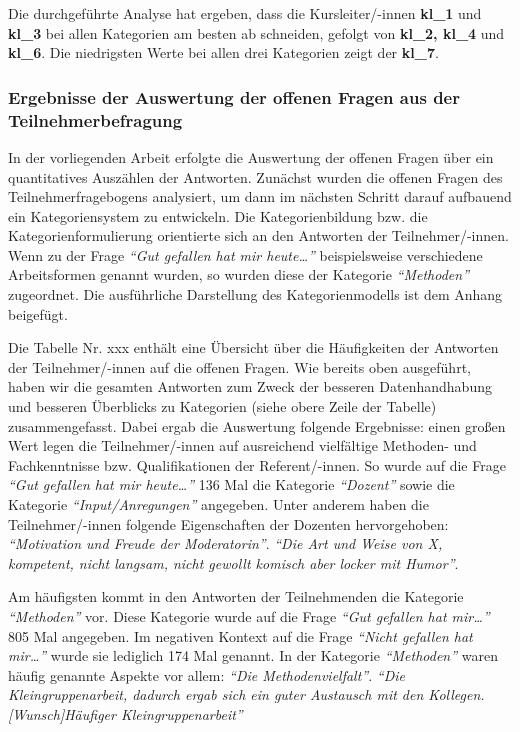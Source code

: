 \documentclass[12pt,a4paper]{article}
\begin{document}
Die durchgeführte Analyse hat ergeben, dass die Kursleiter/-innen \textbf{kl\_1} und \textbf{kl\_3} bei allen Kategorien am besten ab schneiden, gefolgt von \textbf{kl\_2, kl\_4} und \textbf{kl\_6}. Die niedrigsten Werte bei allen drei Kategorien zeigt der \textbf{kl\_7}.

\subsubsection{Ergebnisse der Auswertung der offenen Fragen aus der Teilnehmerbefragung}

In der vorliegenden Arbeit erfolgte die Auswertung der offenen Fragen über ein quantitatives Auszählen der Antworten. Zunächst wurden die offenen Fragen des Teilnehmerfragebogens analysiert, um dann im nächsten Schritt darauf aufbauend ein Kategoriensystem zu entwickeln. Die Kategorienbildung bzw. die Kategorienformulierung orientierte sich an den Antworten der Teilnehmer/-innen. Wenn zu der Frage\textit{ "`Gut gefallen hat mir heute…"'} beispielsweise verschiedene Arbeitsformen  genannt wurden, so wurden diese der Kategorie \textit{"`Methoden"'} zugeordnet. Die ausführliche Darstellung des Kategorienmodells ist dem Anhang beigefügt.

Die Tabelle Nr. xxx 
enthält eine Übersicht über die Häufigkeiten der Antworten der Teilnehmer/-innen auf die offenen Fragen. Wie bereits oben ausgeführt, haben wir die gesamten Antworten zum Zweck der besseren Datenhandhabung und besseren Ü\-ber\-blicks zu Kategorien (siehe obere Zeile der Tabelle) zusammengefasst. Dabei ergab die Auswertung folgende Ergebnisse: einen großen Wert legen die Teil\-neh\-mer/-in\-nen auf ausreichend vielfältige Methoden- und Fachkenntnisse bzw. Qualifikationen der Referent/-innen. So wurde auf die Frage\textit{ "`Gut gefallen hat mir heute…"'} 136 Mal die Kategorie \textit{"`Dozent"'} sowie die Kategorie \textit{"`Input/Anregungen"'} angegeben. Unter anderem haben die Teilnehmer/-innen folgende Eigenschaften der Dozenten hervorgehoben: 
\textit{"`Motivation und Freude der Moderatorin"'}.
\textit{"`Die Art und Weise von X, kompetent, nicht langsam, nicht gewollt komisch aber locker mit Humor"'}.

	Am häufigsten kommt in den Antworten der Teilnehmenden die Kategorie \textit{"`Methoden"'} vor. Diese Kategorie wurde auf die Frage \textit{"`Gut gefallen hat mir…"'} 805 Mal angegeben. Im negativen Kontext auf die Frage \textit{"`Nicht gefallen hat mir…"'} wurde sie lediglich 174 Mal genannt. In der Kategorie \textit{"`Methoden"'} waren häufig genannte Aspekte vor allem: 
\textit{ "`Die Methodenvielfalt"'}.
\textit{"`Die Kleingruppenarbeit, dadurch ergab sich ein guter Austausch mit den Kollegen. [Wunsch]Häufiger Kleingruppenarbeit"'}
\end{document}
